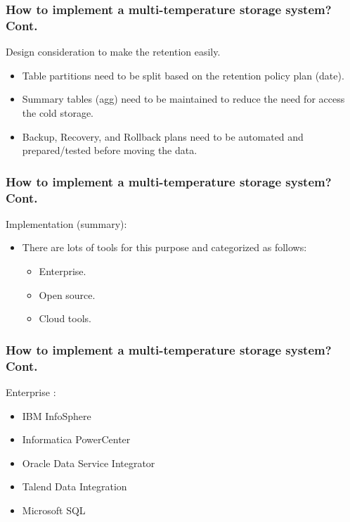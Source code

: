 \begin{frame}
	\frametitle{How to implement a multi-temperature storage system? Cont.}
	
	\begin{wideitemize}
			\item Design consideration to make the retention easily.
			\begin{itemize}[<+->]
				\item Table partitions need to be split based on the retention policy plan \forexample (date).
				\item Summary tables (agg) need to be maintained to reduce the need for access the cold storage.
				\item Backup, Recovery, and Rollback plans need to be automated and prepared/tested before moving the data.
			\end{itemize}
	\end{wideitemize}
\end{frame}



\begin{frame}
	\frametitle{How to implement a multi-temperature storage system? Cont.}
	\begin{wideitemize}
		\item Implementation (summary):
		\begin{itemize}[<+->]
			\item There are lots of tools for this purpose and  categorized as follows:
			\begin{itemize}
				\item Enterprise.
				\item Open source.
				\item Cloud tools.
			\end{itemize}
			
		\end{itemize}
	\end{wideitemize}
\end{frame}

\begin{frame}
    \frametitle{How to implement a multi-temperature storage system? Cont.}
    \begin{wideitemize}
            \item Enterprise \forexample:
            \begin{itemize}
                \item IBM InfoSphere
                \item Informatica PowerCenter
                \item Oracle Data Service Integrator
                \item Talend Data Integration
                \item Microsoft SQL
            \end{itemize}
    \end{wideitemize}
\end{frame}

